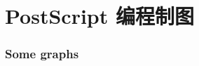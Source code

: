 \documentclass[zihao=-4,linespread=1.5,heading=true,a4paper,twoside]{ctexart}
\begin{document}
\newpage\part{PostScript 编程制图}
\section{Some graphs}


%

%

%

%


%

%

%
\end{document}
